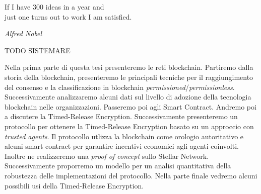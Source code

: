 \documentclass[12pt,twoside]{toptesi}
\begin{document}

\paginavuota




\frontmatter



\begin{flushright}
	\noindent
	If I have 300 ideas in a year and
	\\just one turns out to work I am satisfied.

	\textit{Alfred Nobel}
\end{flushright}
\paginavuota


\sommario
TODO SISTEMARE

Nella prima parte di questa tesi presenteremo le reti blockchain.
Partiremo dalla storia della blockchain, presenteremo le principali tecniche per il
raggiungimento del consenso e la classificazione in blockchain
\textit{permissioned}/\textit{permissionless}. Successivamente analizzaremo alcuni dati
sul livello di adozione della tecnologia blockchain nelle organizzazioni.
Passeremo poi agli Smart Contract. Andremo poi a discutere la Timed-Release Encryption.
Successivamente presenteremo un protocollo per ottenere la Timed-Release Encryption
basato su un approccio con \textit{trusted agents}.
Il protocollo utlizza la blockchain come orologio autoritativo e alcuni
smart contract per garantire incentivi economici agli agenti coinvolti.
Inoltre ne realizzeremo una \textit{proof of concept} sullo Stellar Network.
Successivamente proporremo un modello per un analisi quantitativa della robustezza
delle implementazioni del protocollo.
Nella parte finale vedremo alcuni possibili usi della Timed-Release Encryption.
\paginavuota
\end{document}
